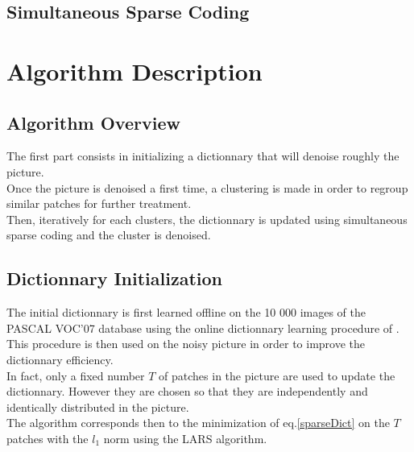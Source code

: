\documentclass{ipol}
\begin{document}
\subsection {Simultaneous Sparse Coding}


\section{Algorithm Description}

\subsection{ Algorithm Overview }

The first part consists in initializing a dictionnary that will denoise roughly the picture.\\
Once the picture is denoised a first time, a clustering is made in order to regroup similar patches for further treatment.\\
Then, iteratively for each clusters, the dictionnary is updated using simultaneous sparse coding and the cluster is denoised.

\subsection{Dictionnary Initialization}

The initial dictionnary is first learned offline on the 10 000 images of the PASCAL VOC'07 database using the  online dictionnary learning procedure of \cite{onlineLearning}. This procedure is then used on the noisy picture in order to improve the dictionnary efficiency.\\
In fact, only a fixed number $T$ of patches in the picture are used to update the dictionnary. However they are chosen so that they are independently and identically distributed in the picture.\\
The algorithm corresponds then to the minimization of eq.\ref{sparseDict} on the $T$ patches with the $l_1$ norm using the LARS \cite{LARS} algorithm.\\
\end{document}
